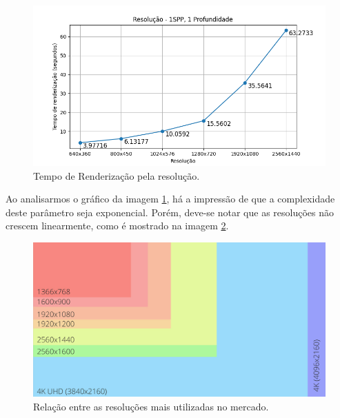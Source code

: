 \documentclass[journal]{IEEEtran}
\begin{document}
\begin{figure}[ht]
  \centering
  \includegraphics[width=\linewidth]{media/Desktop_RES.png}
  \caption{Tempo de Renderização pela resolução.}
  \label{img_desktop_res}
\end{figure}

Ao analisarmos o gráfico da imagem \ref{img_desktop_res}, há a impressão de que a complexidade deste parâmetro seja exponencial.
Porém, deve-se notar que as resoluções não crescem linearmente, como é mostrado na imagem \ref{img_resolutions}.

\begin{figure}[ht]
  \centering
  \includegraphics[width=\linewidth]{media/resolutions.png}
  \caption{Relação entre as resoluções mais utilizadas no mercado.}
  \label{img_resolutions}
\end{figure}
\end{document}
